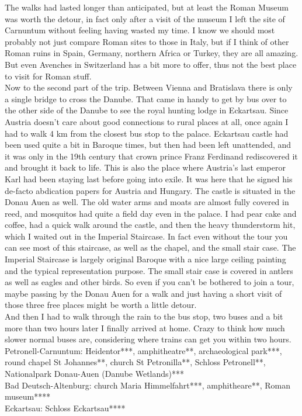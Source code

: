 {The walks had lasted longer than anticipated, but at least the Roman Museum was worth the detour, in fact only after a visit of the museum I left the site of Carnuntum without feeling having wasted my time. I know we should most probably not just compare Roman sites to those in Italy, but if I think of other Roman ruins in Spain, Germany, northern Africa or Turkey, they are all amazing. But even Avenches in Switzerland has a bit more to offer, thus not the best place to visit for Roman stuff.\\
Now to the second part of the trip. Between Vienna and Bratislava there is only a single bridge to cross the Danube. That came in handy to get by bus over to the other side of the Danube to see the royal hunting lodge in Eckartsau. Since Austria doesn't care about good connections to rural places at all, once again I had to walk 4 km from the closest bus stop to the palace. Eckartsau castle had been used quite a bit in Baroque times, but then had been left unattended, and it was only in the 19th century that crown prince Franz Ferdinand rediscovered it and brought it back to life. This is also the place where Austria's last emperor Karl had been staying last before going into exile. It was here that he signed his de-facto abdication papers for Austria and Hungary. The castle is situated in the Donau Auen as well. The old water arms and moats are almost fully covered in reed, and mosquitos had quite a field day even in the palace. I had pear cake and coffee, had a quick walk around the castle, and then the heavy thunderstorm hit, which I waited out in the Imperial Staircase. In fact even without the tour you can see most of this staircase, as well as the chapel, and the small stair case. The Imperial Staircase is largely original Baroque with a nice large ceiling painting and the typical representation purpose. The small stair case is covered in antlers as well as eagles and other birds. So even if you can't be bothered to join a tour, maybe passing by the Donau Auen for a walk and just having a short visit of those three free places might be worth a little detour.\\
And then I had to walk through the rain to the bus stop, two buses and a bit more than two hours later I finally arrived at home. Crazy to think how much slower normal buses are, considering where trains can get you within two hours.\\

Petronell-Carnuntum: Heidentor***, amphitheatre**, archaeological park***, round chapel St Johannes**, church St Petronilla**, Schloss Petronell**, Nationalpark Donau-Auen (Danube Wetlands)***\\
Bad Deutsch-Altenburg: church Maria Himmelfahrt***, amphitheare**, Roman museum****\\
Eckartsau: Schloss Eckartsau****\\

}
